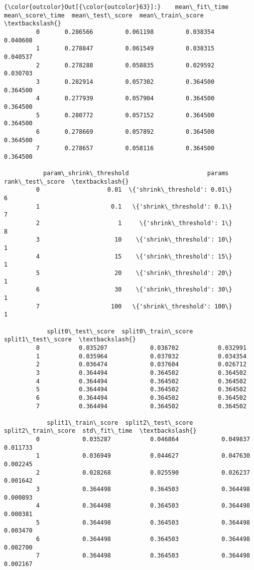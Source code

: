 \documentclass[11pt]{article}
\begin{document}
            \begin{Verbatim}[commandchars=\\\{\}]
{\color{outcolor}Out[{\color{outcolor}63}]:}    mean\_fit\_time  mean\_score\_time  mean\_test\_score  mean\_train\_score  \textbackslash{}
         0       0.286566         0.061198         0.038354          0.040608   
         1       0.278847         0.061549         0.038315          0.040537   
         2       0.278288         0.058835         0.029592          0.030703   
         3       0.282914         0.057302         0.364500          0.364500   
         4       0.277939         0.057904         0.364500          0.364500   
         5       0.280772         0.057152         0.364500          0.364500   
         6       0.278669         0.057892         0.364500          0.364500   
         7       0.278657         0.058116         0.364500          0.364500   
         
           param\_shrink\_threshold                      params  rank\_test\_score  \textbackslash{}
         0                   0.01  \{'shrink\_threshold': 0.01\}                6   
         1                    0.1   \{'shrink\_threshold': 0.1\}                7   
         2                      1     \{'shrink\_threshold': 1\}                8   
         3                     10    \{'shrink\_threshold': 10\}                1   
         4                     15    \{'shrink\_threshold': 15\}                1   
         5                     20    \{'shrink\_threshold': 20\}                1   
         6                     30    \{'shrink\_threshold': 30\}                1   
         7                    100   \{'shrink\_threshold': 100\}                1   
         
            split0\_test\_score  split0\_train\_score  split1\_test\_score  \textbackslash{}
         0           0.035207            0.036702           0.032991   
         1           0.035964            0.037032           0.034354   
         2           0.036474            0.037604           0.026712   
         3           0.364494            0.364502           0.364502   
         4           0.364494            0.364502           0.364502   
         5           0.364494            0.364502           0.364502   
         6           0.364494            0.364502           0.364502   
         7           0.364494            0.364502           0.364502   
         
            split1\_train\_score  split2\_test\_score  split2\_train\_score  std\_fit\_time  \textbackslash{}
         0            0.035287           0.046864            0.049837      0.011733   
         1            0.036949           0.044627            0.047630      0.002245   
         2            0.028268           0.025590            0.026237      0.001642   
         3            0.364498           0.364503            0.364498      0.000893   
         4            0.364498           0.364503            0.364498      0.000381   
         5            0.364498           0.364503            0.364498      0.003470   
         6            0.364498           0.364503            0.364498      0.002700   
         7            0.364498           0.364503            0.364498      0.002167   
         

\end{Verbatim}
\end{document}
